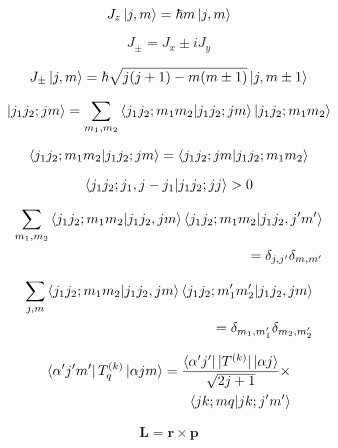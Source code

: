 \documentclass[11pt]{article}
\newcommand{\vect}[1]{\boldsymbol{\mathbf{#1}}}
\begin{document}
\begin{multicols}{2}
\begin{equation}
J_z \ket{j,m} = \hbar m \ket{j,m}
\end{equation}

\begin{equation}
J_{\pm} = J_x \pm i J_y
\end{equation}

\begin{equation}
J_{\pm} \ket{j,m} = \hbar \sqrt{j(j+1)-m(m\pm1)} \ket{j,m\pm1}
\end{equation}

\begin{equation}
\ket{j_1j_2;jm} =
 \sum_{m_1,m_2} \braket{j_1j_2;m_1m_2|j_1j_2;jm} \ket{j_1j_2;m_1m_2}
\end{equation}

\begin{equation}
\braket{j_1j_2;m_1m_2|j_1j_2;jm}
 = \braket{j_1j_2;jm|j_1j_2;m_1m_2}
\end{equation}

\begin{equation}
\braket{j_1j_2;j_1,j-j_1|j_1j_2;jj} > 0
\end{equation}

\begin{equation}
\begin{split}
\sum_{m_1,m_2} \braket{j_1j_2;m_1m_2|j_1j_2,jm} \braket{j_1j_2;m_1m_2|j_1j_2,j'm'} \\ = \delta_{j,j'}\delta_{m,m'}
\end{split}
\end{equation}

\begin{equation}
\begin{split}
\sum_{j,m} \braket{j_1j_2;m_1m_2|j_1j_2,jm} \braket{j_1j_2;m_1'm_2'|j_1j_2,jm} \\ = \delta_{m_1,m_1'}\delta_{m_2,m_2'}
\end{split}
\end{equation}

\begin{equation}
\begin{split}
\bra{\alpha' j' m'}T^{(k)}_q\ket{\alpha j m} =
  \frac{\bra{\alpha ' j'}|T^{(k)}|\ket{\alpha j}}{\sqrt{2j+1}} \times \\
  \braket{jk;mq|jk;j'm'}
\end{split}
\end{equation}

\begin{equation}
\vect{L} = \vect{r} \times \vect{p}
\end{equation}


\end{multicols}
\end{document}
